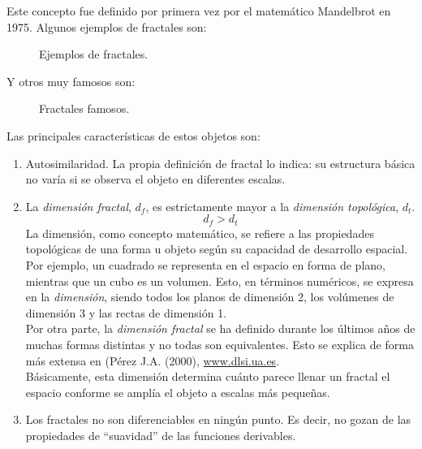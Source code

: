 \documentclass[a4paper, openright, 11pt, titlepage]{report}
\theoremstyle{definition}\newtheorem{defin}[propo]{Definition}
\theoremstyle{definition}\newtheorem{obser}[propo]{Remark}
\theoremstyle{definition}\newtheorem{ejem}[propo]{Ejemplo}
\theoremstyle{definition}\newtheorem{algoritmo}[propo]{Algoritmo}
\begin{document}
\begin{itemize}
    Este concepto fue definido por primera vez por el matemático Mandelbrot en 1975. Algunos ejemplos de fractales son:
    \begin{figure}[H]
        \centering
         \hspace{1.7cm}
        \caption{Ejemplos de fractales.}
    \end{figure}
    Y otros muy famosos son:
    \begin{figure}[H]
        \centering
         \hspace{1.7cm}
        \caption{Fractales famosos.}
    \end{figure}
    Las principales características de estos objetos son:
    \begin{enumerate}
        \item Autosimilaridad. La propia definición de fractal lo indica: su estructura básica no varía si se observa el objeto en diferentes escalas.
        \item La \textit{dimensión fractal}, $d_{f}$, es estrictamente mayor a la \textit{dimensión topológica}, $d_{t}$.
        $$d_{f} > d_{t}$$
        La dimensión, como concepto matemático, se refiere a las propiedades topológicas de una forma u objeto según su capacidad de desarrollo espacial. Por ejemplo, un cuadrado se representa en el espacio en forma de plano, mientras que un cubo es un volumen. Esto, en términos numéricos, se expresa en la \textit{dimensión}, siendo todos los planos de dimensión 2, los volúmenes de dimensión 3 y las rectas de dimensión 1.\\
        Por otra parte, la \textit{dimensión fractal} se ha definido durante los últimos años de muchas formas distintas y no todas son equivalentes. Esto se explica de forma más extensa en \cite{fractales} ({Pérez J.A.} (2000), \url{www.dlsi.ua.es}.\\
        Básicamente, esta dimensión determina cuánto parece llenar un fractal el espacio conforme se amplía el objeto a escalas más pequeñas.
        \item Los fractales no son diferenciables en ningún punto. Es decir, no gozan de las propiedades de “suavidad” de las funciones derivables.
    \end{enumerate}

\end{itemize}
\end{document}
